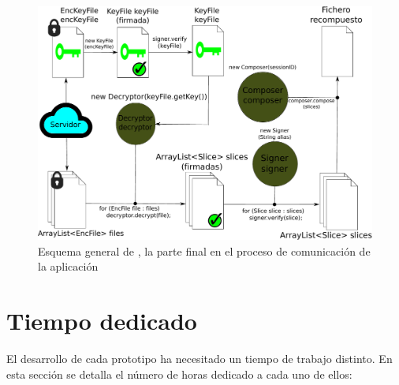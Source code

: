 \begin{figure}[!htb]
  \centering
  \includegraphics[scale=0.44]{Figures/abstractB}
  \decoRule
  \caption[]{Esquema general de , la parte final en el proceso de comunicación de la aplicación}
  \label{fig:abstractB}
\end{figure}


\section{Tiempo dedicado}

El desarrollo de cada prototipo ha necesitado un tiempo de trabajo distinto. En esta sección se detalla el número de horas dedicado a cada uno de ellos:

